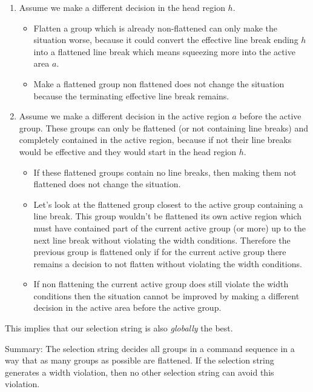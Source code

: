 \documentclass[12pt]{article}
\begin{document}
\begin{enumerate}

\item Assume we make a different decision in the head region $h$.
  \begin{itemize}
  \item
    Flatten a group which is already non-flattened can only make the situation
    worse, because it could convert the effective line break ending $h$ into a
    flattened line break which means squeezing more into the active area $a$.
  \item
    Make a flattened group non flattened does not change the situation because
    the terminating effective line break remains.
  \end{itemize}

\item Assume we make a different decision in the active region $a$ before the
  active group. These groups can only be flattened (or not containing line
  breaks) and completely contained in the active region, because if not their
  line breaks would be effective and they would start in the head region $h$.
  \begin{itemize}
  \item If these flattened groups contain no line breaks, then making them not
    flattened does not change the situation.

  \item Let's look at the flattened group closest to the active group
    containing a line break. This group wouldn't be flattened its own active
    region which must have contained part of the current active group (or
    more) up to the next line break without violating the width
    conditions. Therefore the previous group is flattened only if for the
    current active group there remains a decision to not flatten without
    violating the width conditions.

  \item If non flattening the current active group does still violate the
    width conditions then the situation cannot be improved by making a
    different decision in the active area before the active group.
  \end{itemize}
\end{enumerate}
This implies that our selection string is also \emph{globally} the best.

Summary: The selection string decides all groups in a command sequence in a
way that as many groups as possible are flattened. If the selection string
generates a width violation, then no other selection string can avoid this
violation.
\end{document}

